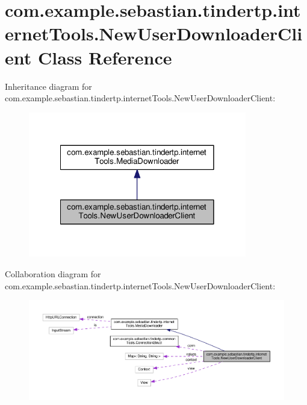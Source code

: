 \hypertarget{classcom_1_1example_1_1sebastian_1_1tindertp_1_1internetTools_1_1NewUserDownloaderClient}{}\section{com.\+example.\+sebastian.\+tindertp.\+internet\+Tools.\+New\+User\+Downloader\+Client Class Reference}
\label{classcom_1_1example_1_1sebastian_1_1tindertp_1_1internetTools_1_1NewUserDownloaderClient}


Inheritance diagram for com.\+example.\+sebastian.\+tindertp.\+internet\+Tools.\+New\+User\+Downloader\+Client\+:\nopagebreak
\begin{figure}[H]
\begin{center}
\leavevmode
\includegraphics[width=270pt]{classcom_1_1example_1_1sebastian_1_1tindertp_1_1internetTools_1_1NewUserDownloaderClient__inherit__graph}
\end{center}
\end{figure}


Collaboration diagram for com.\+example.\+sebastian.\+tindertp.\+internet\+Tools.\+New\+User\+Downloader\+Client\+:\nopagebreak
\begin{figure}[H]
\begin{center}
\leavevmode
\includegraphics[width=350pt]{classcom_1_1example_1_1sebastian_1_1tindertp_1_1internetTools_1_1NewUserDownloaderClient__coll__graph}
\end{center}
\end{figure}
